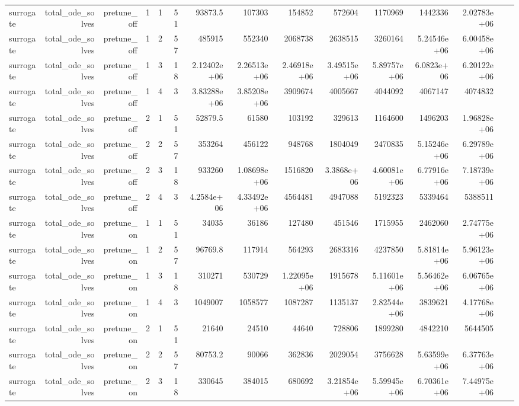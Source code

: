\begin{table}[htbp]
\begin{tabular}{lrrrrrrrrrrrrrr}
surrogate & total\_ode\_solves & pretune\_off & 1 & 1 & 51 & 93873.5 & 107303 & 154852 & 572604 & 1170969 & 1442336 & 2.02783e+06 &  &  \\
surrogate & total\_ode\_solves & pretune\_off & 1 & 2 & 57 & 485915 & 552340 & 2068738 & 2638515 & 3260164 & 5.24546e+06 & 6.00458e+06 &  &  \\
surrogate & total\_ode\_solves & pretune\_off & 1 & 3 & 18 & 2.12402e+06 & 2.26513e+06 & 2.46918e+06 & 3.49515e+06 & 5.89757e+06 & 6.0823e+06 & 6.20122e+06 &  &  \\
surrogate & total\_ode\_solves & pretune\_off & 1 & 4 & 3 & 3.83288e+06 & 3.85208e+06 & 3909674 & 4005667 & 4044092 & 4067147 & 4074832 &  &  \\
surrogate & total\_ode\_solves & pretune\_off & 2 & 1 & 51 & 52879.5 & 61580 & 103192 & 329613 & 1164600 & 1496203 & 1.96828e+06 &  &  \\
surrogate & total\_ode\_solves & pretune\_off & 2 & 2 & 57 & 353264 & 456122 & 948768 & 1804049 & 2470835 & 5.15246e+06 & 6.29789e+06 &  &  \\
surrogate & total\_ode\_solves & pretune\_off & 2 & 3 & 18 & 933260 & 1.08698e+06 & 1516820 & 3.3868e+06 & 4.60081e+06 & 6.77916e+06 & 7.18739e+06 &  &  \\
surrogate & total\_ode\_solves & pretune\_off & 2 & 4 & 3 & 4.2584e+06 & 4.33492e+06 & 4564481 & 4947088 & 5192323 & 5339464 & 5388511 &  &  \\
surrogate & total\_ode\_solves & pretune\_on & 1 & 1 & 51 & 34035 & 36186 & 127480 & 451546 & 1715955 & 2462060 & 2.74775e+06 &  &  \\
surrogate & total\_ode\_solves & pretune\_on & 1 & 2 & 57 & 96769.8 & 117914 & 564293 & 2683316 & 4237850 & 5.81814e+06 & 5.96123e+06 &  &  \\
surrogate & total\_ode\_solves & pretune\_on & 1 & 3 & 18 & 310271 & 530729 & 1.22095e+06 & 1915678 & 5.11601e+06 & 5.56462e+06 & 6.06765e+06 &  &  \\
surrogate & total\_ode\_solves & pretune\_on & 1 & 4 & 3 & 1049007 & 1058577 & 1087287 & 1135137 & 2.82544e+06 & 3839621 & 4.17768e+06 &  &  \\
surrogate & total\_ode\_solves & pretune\_on & 2 & 1 & 51 & 21640 & 24510 & 44640 & 728806 & 1899280 & 4842210 & 5644505 &  &  \\
surrogate & total\_ode\_solves & pretune\_on & 2 & 2 & 57 & 80753.2 & 90066 & 362836 & 2029054 & 3756628 & 5.63599e+06 & 6.37763e+06 &  &  \\
surrogate & total\_ode\_solves & pretune\_on & 2 & 3 & 18 & 330645 & 384015 & 680692 & 3.21854e+06 & 5.59945e+06 & 6.70361e+06 & 7.44975e+06 &  &  \\

\end{tabular}
\end{table}
